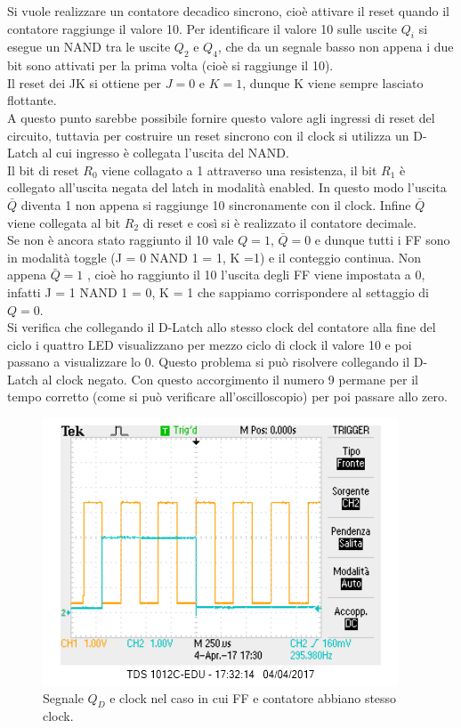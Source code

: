 \documentclass[10pt,a4paper]{article}
\begin{document}
Si vuole realizzare un contatore decadico sincrono, cioè attivare il reset quando il contatore raggiunge il valore 10. Per identificare il valore 10 sulle uscite $Q_i$ si esegue un NAND tra le uscite $Q_2$ e $Q_4$, che da un segnale basso non appena i due bit sono attivati per la prima volta (cioè si raggiunge il 10). \\
Il reset dei JK si ottiene per $J = 0$ e $K = 1$, dunque K viene sempre lasciato flottante.\\
A questo punto sarebbe possibile fornire questo valore agli ingressi di reset del circuito, tuttavia per costruire un reset sincrono con il clock si utilizza un D-Latch al cui ingresso è collegata l'uscita del NAND.\\
Il bit di reset $R_0$ viene collagato a 1 attraverso una resistenza, il bit $R_1$ è collegato all'uscita negata del latch in modalità enabled. In questo modo l'uscita $\bar{Q}$ diventa 1 non appena si raggiunge 10 sincronamente con il clock. Infine $\bar{Q}$ viene collegata al bit $R_2$%
 di reset e così si è realizzato il contatore decimale.\\
Se non è ancora stato raggiunto il 10 vale $Q = 1$, $\bar{Q} = 0$ e dunque tutti i FF sono in modalità toggle (J = 0 NAND 1 = 1, K =1) e il conteggio continua. Non appena $\bar{Q} = 1$ , cioè ho raggiunto il 10 l'uscita degli FF viene impostata a 0, infatti J = 1 NAND 1 = 0, K = 1 che sappiamo corrispondere al settaggio di $Q = 0$.\\
Si verifica che collegando il D-Latch allo stesso clock del contatore alla fine del ciclo i quattro LED visualizzano per mezzo ciclo di clock il valore 10 e poi passano a visualizzare lo 0. Questo problema si può risolvere collegando il D-Latch al clock negato. Con questo accorgimento il numero 9 permane per il tempo corretto (come si può verificare all'oscilloscopio) per poi passare allo zero.\\


\begin{figure}
\centering
\includegraphics[scale=1.0]{clocksbagliato.png}
\caption{Segnale $Q_D$ e clock nel caso in cui FF e contatore abbiano stesso clock.\label{sbagliato}}
\end{figure}
\end{document}
